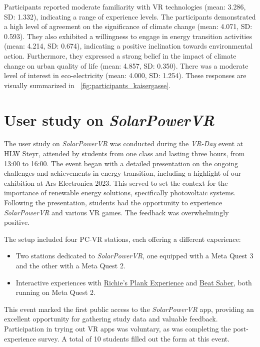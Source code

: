\documentclass[draft, final]{vutinfth} %
\begin{document}
Participants reported moderate familiarity with VR technologies (mean: 3.286, SD: 1.332), indicating a range of experience levels. The participants demonstrated a high level of agreement on the significance of climate change (mean: 4.071, SD: 0.593). They also exhibited a willingness to engage in energy transition activities (mean: 4.214, SD: 0.674), indicating a positive inclination towards environmental action. Furthermore, they expressed a strong belief in the impact of climate change on urban quality of life (mean: 4.857, SD: 0.350). There was a moderate level of interest in eco-electricity (mean: 4.000, SD: 1.254). These responses are visually summarized in \figurename~\ref{fig:participants_kaisergasse}.

\section{User study on \textit{SolarPowerVR}}

The user study on \textit{SolarPowerVR} was conducted during the \textit{VR-Day} event at HLW Steyr, attended by students from one class and lasting three hours, from 13:00 to 16:00. The event began with a detailed presentation on the ongoing challenges and achievements in energy transition, including a highlight of our exhibition at Ars Electronica 2023. This served to set the context for the importance of renewable energy solutions, specifically photovoltaic systems. Following the presentation, students had the opportunity to experience \textit{SolarPowerVR} and various VR games. The feedback was overwhelmingly positive.

The setup included four PC-VR stations, each offering a different experience:
\begin{itemize}
    \item Two stations dedicated to \textit{SolarPowerVR}, one equipped with a Meta Quest 3 and the other with a Meta Quest 2.
    \item Interactive experiences with \hyperlink{https://store.steampowered.com/app/517160/Richies_Plank_Experience/}{Richie's Plank Experience} and \hyperlink{https://store.steampowered.com/app/620980/Beat_Saber/}{Beat Saber}, both running on Meta Quest 2.
\end{itemize}

This event marked the first public access to the \textit{SolarPowerVR} app, providing an excellent opportunity for gathering study data and valuable feedback. Participation in trying out VR apps was voluntary, as was completing the post-experience survey. A total of 10 students filled out the form at this event.
\end{document}
